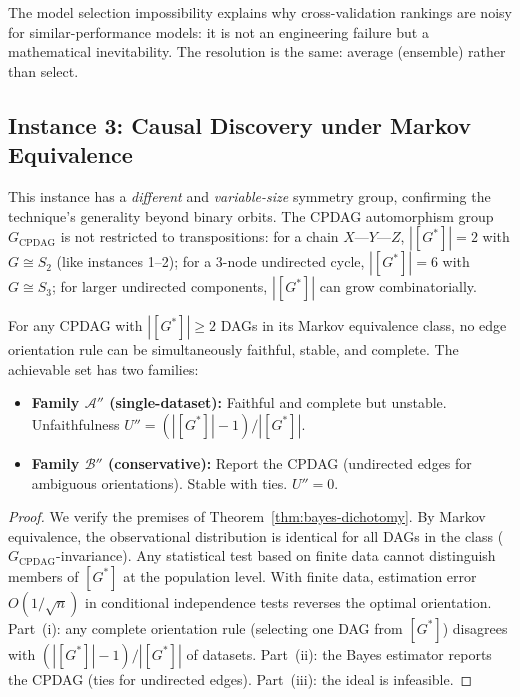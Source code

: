 \documentclass{jmlr}
\begin{document}
The model selection impossibility explains why cross-validation rankings are noisy for similar-performance models: it is not an engineering failure but a mathematical inevitability. The resolution is the same: average (ensemble) rather than select.

\subsection{Instance 3: Causal Discovery under Markov Equivalence}

This instance has a \emph{different} and \emph{variable-size} symmetry group, confirming the technique's generality beyond binary orbits. The CPDAG automorphism group $G_{\text{CPDAG}}$ is not restricted to transpositions: for a chain $X\text{---}Y\text{---}Z$, $|[G^*]| = 2$ with $G \cong S_2$ (like instances 1--2); for a 3-node undirected cycle, $|[G^*]| = 6$ with $G \cong S_3$; for larger undirected components, $|[G^*]|$ can grow combinatorially.

\begin{theorem}
\label{thm:causal-discovery}
For any CPDAG with $|[G^*]| \geq 2$ DAGs in its Markov equivalence class, no edge orientation rule can be simultaneously faithful, stable, and complete.
The achievable set has two families:
\begin{itemize}
    \item \textbf{Family $\mathcal{A}''$ (single-dataset):} Faithful and complete but unstable. Unfaithfulness $U'' = (|[G^*]|-1)/|[G^*]|$.
    \item \textbf{Family $\mathcal{B}''$ (conservative):} Report the CPDAG (undirected edges for ambiguous orientations). Stable with ties. $U'' = 0$.
\end{itemize}
\end{theorem}

\begin{proof}
We verify the premises of Theorem~\ref{thm:bayes-dichotomy}. By Markov equivalence, the observational distribution is identical for all DAGs in the class ($G_{\text{CPDAG}}$-invariance). Any statistical test based on finite data cannot distinguish members of $[G^*]$ at the population level. With finite data, estimation error $O(1/\sqrt{n})$ in conditional independence tests reverses the optimal orientation. Part~(i): any complete orientation rule (selecting one DAG from $[G^*]$) disagrees with $(|[G^*]|-1)/|[G^*]|$ of datasets. Part~(ii): the Bayes estimator reports the CPDAG (ties for undirected edges). Part~(iii): the ideal is infeasible.
\end{proof}
\end{document}
